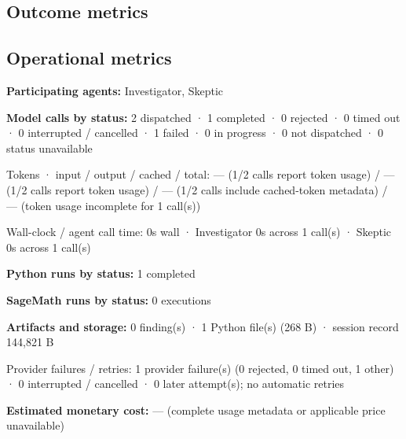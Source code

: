 \documentclass[11pt]{article}
\begin{document}
\subsection{Outcome metrics}
\subsection{Operational metrics}
\textbf{Participating agents:} Investigator, Skeptic\par
\textbf{Model calls by status:} 2 dispatched · 1 completed · 0 rejected · 0 timed out · 0 interrupted / cancelled · 1 failed · 0 in progress · 0 not dispatched · 0 status unavailable\par
Tokens · input / output / cached / total: — (1/2 calls report token usage) / — (1/2 calls report token usage) / — (1/2 calls include cached-token metadata) / — (token usage incomplete for 1 call(s))\par
Wall-clock / agent call time: 0s wall · Investigator 0s across 1 call(s) · Skeptic 0s across 1 call(s)\par
\textbf{Python runs by status:} 1 completed\par
\textbf{SageMath runs by status:} 0 executions\par
\textbf{Artifacts and storage:} 0 finding(s) · 1 Python file(s) (268 B) · session record 144,821 B\par
Provider failures / retries: 1 provider failure(s) (0 rejected, 0 timed out, 1 other) · 0 interrupted / cancelled · 0 later attempt(s); no automatic retries\par
\textbf{Estimated monetary cost:} — (complete usage metadata or applicable price unavailable)\par
\end{document}
